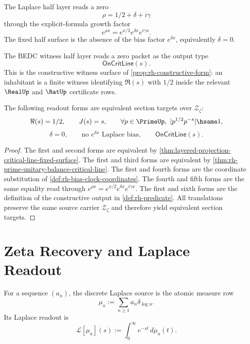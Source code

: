 \begin{definition}
\label{def:rh-layered-laplace-half-layer}
The Laplace half layer reads a zero
$$
\rho=1/2+\delta+i\gamma
$$
through the explicit-formula growth factor
$$
e^{\rho x}=e^{x/2}e^{\delta x}e^{i\gamma x}.
$$
The fixed half surface is the absence of the bias factor $e^{\delta x}$,
equivalently $\delta=0$.
\end{definition}

\begin{definition}
\label{def:rh-layered-bedc-witness-half-layer}
The BEDC witness half layer reads a zero packet as the output type
$$
\mathsf{OnCritLine}(s).
$$
This is the constructive witness surface of
\autoref{prop:rh-constructive-form}: an inhabitant is a finite witness
identifying $\Re(s)$ with $1/2$ inside the relevant $\RealUp$ and
$\RatUp$ certificate rows.
\end{definition}

\begin{theorem}
\label{thm:rh-layered-translations}
The following readout forms are equivalent section targets over
$\mathcal Z_{\zeta}$:
$$
\Re(s)=1/2,
\qquad
J(s)=s,
\qquad
\forall p\in\PrimeUp,\ |p^{1/2}p^{-s}|\hsame 1,
$$
$$
\delta=0,
\qquad
\text{no }e^{\delta x}\text{ Laplace bias},
\qquad
\mathsf{OnCritLine}(s).
$$
\end{theorem}

\begin{proof}
The first and second forms are equivalent by
\autoref{thm:layered-projection-critical-line-fixed-surface}. The first
and third forms are equivalent by
\autoref{thm:rh-prime-unitary-balance-critical-line}. The first and
fourth forms are the coordinate substitution of
\autoref{def:rh-bias-clock-coordinates}. The fourth and fifth forms are
the same equality read through
$e^{\rho x}=e^{x/2}e^{\delta x}e^{i\gamma x}$. The first and sixth forms
are the definition of the constructive output in
\autoref{def:rh-predicate}. All translations preserve the same source
carrier $\mathcal Z_{\zeta}$ and therefore yield equivalent section
targets.
\end{proof}

\section{Zeta Recovery and Laplace Readout}
\label{sec:rh-layered-zeta-laplace-readout}

\begin{definition}
\label{def:rh-layered-discrete-laplace-source}
For a sequence $(a_n)$, the discrete Laplace source is the atomic measure
row
$$
\mu_a:=\sum_{n\ge 1}a_n\delta_{\log n}.
$$
Its Laplace readout is
$$
\mathcal L[\mu_a](s)
:=
\int_0^\infty e^{-st}\,d\mu_a(t).
$$
\end{definition}

